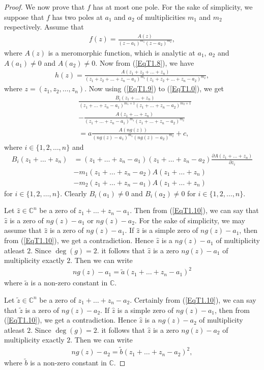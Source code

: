 \documentclass[11pt,reqno]{amsart}
\numberwithin{equation}{section}
\begin{document}
\begin{proof}
We now prove that $f$ has at most one pole. For the sake of simplicity, we suppose that $f$ has two poles at $a_1$ and $a_2$ of multiplicities $m_1$ and $m_2$ respectively. Assume that 
\begin{align}\label{EqT1.8}
f(z)=\frac{A(z)}{(z-a_1)^{m_1}(z-a_2)^{m_2}},
\end{align}
where $A(z)$ is a meromorphic function, which is analytic at $a_1$, $a_2$ and $A(a_1)\neq 0$ and $A(a_2)\neq 0$. Now from (\ref{EqT1.8}), we have 
\begin{align}\label{EqT1.9}
h(z)=\frac{A(z_1+z_2+\ldots+z_n)}{(z_1+z_2+\ldots+z_n-a_1)^{m_1}(z_1+z_2+\ldots+z_n-a_2)^{m_2}},
\end{align}
where $z=(z_1,z_2,\ldots,z_n)$. Now using (\ref{EqT1.9}) to (\ref{EqT1.0}), we get
\begin{align}\label{EqT1.10}
&\frac{B_i(z_1+\ldots+z_n)}{(z_1+\ldots+z_n-a_1)^{m_1+1}(z_1+\ldots+z_n-a_2)^{m_2+1}}\\&-\frac{A(z_1+\ldots+z_n)}{(z_1+\ldots+z_n-a_1)^{m_1}(z_1+\ldots+z_n-a_2)^{m_2}}\nonumber\\&=
a\frac{A(ng(z))}{(ng(z)-a_1)^{m_1}(ng(z)-a_2)^{m_2}}+c,\nonumber
\end{align}
where $i\in\{1,2,\ldots,n\}$ and
\begin{align*}
B_i(z_1+\ldots+z_n)&=(z_1+\ldots+z_n-a_1)(z_1+\ldots+z_n-a_2)\frac{\partial A(z_1+\ldots+z_n)}{\partial z_i}\\&-m_1(z_1+\ldots+z_n-a_2)A(z_1+\ldots+z_n)\\&-m_2(z_1+\ldots+z_n-a_1)A(z_1+\ldots+z_n)
\end{align*}
for $i\in\{1,2,\ldots,n\}$. Clearly $B_i(a_1)\neq 0$ and $B_i(a_2)\neq 0$ for $i\in\{1,2,\ldots,n\}$.

Let $\hat z\in\mathbb{C}^n$ be a zero of $z_1+\ldots+z_n-a_1$. Then from (\ref{EqT1.10}), we can say that $\hat z$ is a zero of $ng(z)-a_1$ or $ng(z)-a_2$. For the sake of simplicity, we may assume that $\hat z$ is a zero of $ng(z)-a_1$. If $\hat z$ is a simple zero of $ng(z)-a_1$, then from (\ref{EqT1.10}), we get a contradiction. Hence $\hat z$ is a $ng(z)-a_1$ of multiplicity atleast $2$. Since $\deg(g)=2$. it follows that $\hat z$ is a zero $ng(z)-a_1$ of multiplicity exactly $2$. Then we can write 
\begin{align}\label{EqT1.11}
ng(z)-a_1=\tilde a\left(z_1+\ldots+z_n-a_1\right)^2
\end{align}
where $\tilde a$ is a non-zero constant in $\mathbb{C}$.

Let $\tilde z\in\mathbb{C}^n$ be a zero of $z_1+\ldots+z_n-a_2$. Certainly from (\ref{EqT1.10}), we can say that $\tilde z$ is a zero of $ng(z)-a_2$. If $\hat z$ is a simple zero of $ng(z)-a_1$, then from (\ref{EqT1.10}), we get a contradiction. Hence $\hat z$ is a $ng(z)-a_2$ of multiplicity atleast $2$. Since $\deg(g)=2$. it follows that $\hat z$ is a zero $ng(z)-a_2$ of multiplicity exactly $2$. Then we can write 
\begin{align}\label{EqT1.12}
ng(z)-a_2=\tilde b\left(z_1+\ldots+z_n-a_2\right)^2,
\end{align}
where $\tilde b$ is a non-zero constant in $\mathbb{C}$.


\end{proof}
\end{document}

